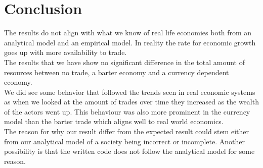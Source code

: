 \documentclass[11p]{article}
\begin{document}
\section{Conclusion}

The results do not align with what we know of real life economies both from an analytical model and an empirical model. In reality the rate for economic growth goes up with more availability to trade.
\\
The results that we have show no significant difference in the total amount of resources between no trade, a barter economy and a currency dependent economy. 
\\

We did see some behavior that followed the trends seen in real economic systems as when we looked at the amount of trades over time they  increased as the wealth of the actors went up. This behaviour was also more prominent in the currency model than the barter trade which aligns well to real world economics. 
\\

The reason for why our result differ from the expected result could stem either from our analytical model of a society being incorrect or incomplete. Another possibility is that the written code does not follow the analytical model for some reason.
\end{document}
